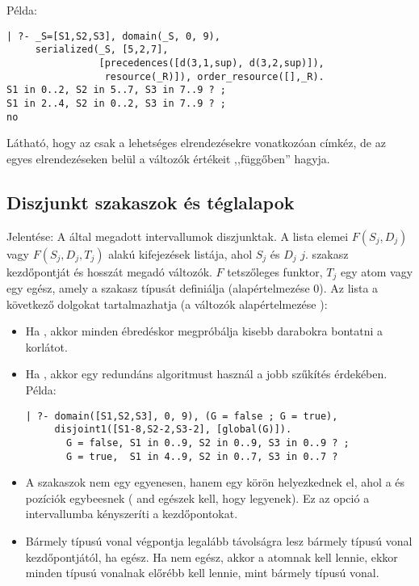 Példa:

\begin{verbatim}
| ?- _S=[S1,S2,S3], domain(_S, 0, 9),
     serialized(_S, [5,2,7],
                [precedences([d(3,1,sup), d(3,2,sup)]),
                 resource(_R)]), order_resource([],_R).
S1 in 0..2, S2 in 5..7, S3 in 7..9 ? ;
S1 in 2..4, S2 in 0..2, S3 in 7..9 ? ;
no
\end{verbatim}

Látható, hogy az  csak a lehetséges elrendezésekre vonatkozóan
címkéz, de az egyes elrendezéseken belül a változók értékeit ,,függőben'' hagyja.

\subsection{Diszjunkt szakaszok és téglalapok}

{}

Jelentése: A  által megadott intervallumok diszjunktak. A  lista
elemei $F(S_j,D_j)$ vagy $F(S_j,D_j,T_j)$ alakú kifejezések listája, ahol $S_j$ és
$D_j$ $j$. szakasz kezdőpontját és hosszát megadó változók. $F$ tetszőleges funktor,
$T_j$ egy atom vagy egy egész, amely a szakasz típusát definiálja (alapértelmezése 0).
Az  lista a következő dolgokat tartalmazhatja (a  változók
alapértelmezése ):

\begin{itemize}
\item {}
          Ha  , akkor minden ébredéskor megpróbálja kisebb
          darabokra bontatni a korlátot.

\item {}
          Ha  , akkor egy redundáns algoritmust használ a
          jobb szűkítés érdekében. Példa:

\begin{verbatim}
| ?- domain([S1,S2,S3], 0, 9), (G = false ; G = true),
     disjoint1([S1-8,S2-2,S3-2], [global(G)]).
       G = false, S1 in 0..9, S2 in 0..9, S3 in 0..9 ? ;
       G = true,  S1 in 4..9, S2 in 0..7, S3 in 0..7 ? 
\end{verbatim}

\item {}
          A szakaszok nem egy egyenesen, hanem egy körön helyezkednek el,
          ahol a  és  pozíciók egybeesnek ( and
           egészek kell, hogy legyenek). Ez az opció a 
          intervallumba kényszeríti a kezdőpontokat.

\item {}
          Bármely  típusú vonal végpontja legalább  távolságra lesz
          bármely  típusú vonal kezdőpontjától, ha  egész.
          Ha  nem egész, akkor a  atomnak kell lennie, ekkor
          minden  típusú vonalnak előrébb kell lennie, mint bármely
           típusú vonal.
\end{itemize}

